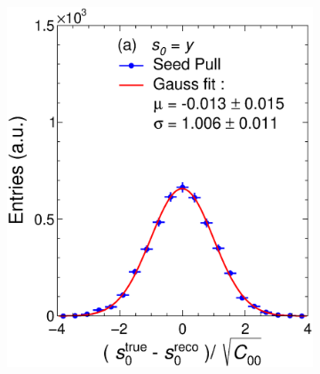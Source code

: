 \begin{figure}[t]
     \centering
     \begin{subfigure}{0.32\textwidth}
         \centering
         \includegraphics[width=\textwidth]{figures/ch4-KF_NDGArLite/Toy/NoCorr/UnitSeed_p0.eps}
         \caption{}
         \label{fig:resp0Seed_GArLite_NoCorr}
     \end{subfigure}
     \begin{subfigure}{0.32\textwidth}
         \centering

\end{subfigure}
\end{figure}
